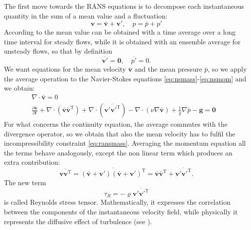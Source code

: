 The first move towards the RANS equations is to decompose each instantaneous 
quantity in the sum of a mean value and a fluctuation: 
\begin{equation} \label{eq:decomp}
\mathbf{v} = \bar{\mathbf{v}} + \mathbf{v}', \quad p = \bar{p} + p'
\end{equation}
According to \cite{main:vermal} the mean value can be obtained with a time 
average over a long time interval 
for steady flows, while it is obtained with an ensemble average for unsteady 
flows, so that by definition
\begin{equation}
	\overline{\mathbf{v}'} = \mathbf{0}, \quad \overline{p'}=0.
\end{equation}
We want equations for the mean 
velocity $\bar{\mathbf{v}}$ and the mean pressure $\bar{p}$, so we apply the 
average operation to the Navier-Stokes equations 
\eqref{eq:nsmass}-\eqref{eq:nsmom} and we obtain:
\begin{align}
\label{eq:ransmass} \nabla \cdot \bar{\mathbf{v}} = 0&\\
\label{eq:ransmom} \frac{\partial \bar{\mathbf{v}}}{\partial t} + \nabla \cdot 
( 
\bar{\mathbf{v}} \bar{\mathbf{v}}^\mathrm{T}) + \nabla \cdot 
(\overline{\mathbf{v}' {\mathbf{v}'}^\mathrm{T}})- \nabla \cdot (\nu \nabla 
\bar{\mathbf{v}}) +\frac{1}{\varrho} \nabla \bar{p} - \mathbf{g} = \mathbf{0}&
\end{align}
For what concerns the continuity equation, the average commutes with the 
divergence operator, so we obtain that also the mean velocity has to fulfil the 
incompressibility constraint \eqref{eq:ransmass}. Averaging the momentum 
equation all the terms behave analogously, except the non linear term which 
produces an extra contribution:
\begin{equation}
	\overline{\mathbf{v} \mathbf{v}^\mathrm{T}} = \overline{(\bar{\mathbf{v}} + 
	\mathbf{v}') (\bar{\mathbf{v}} + \mathbf{v}')^\mathrm{T}} = 
	\bar{\mathbf{v}} \bar{\mathbf{v}}^\mathrm{T} + \overline{\mathbf{v}' 
	{\mathbf{v}'}^\mathrm{T}}.
\end{equation}
The new term
\begin{equation}
\tau_R = -\varrho \overline{\mathbf{v}' {\mathbf{v}'}^\mathrm{T}}
\end{equation}
is called Reynolds stress tensor. Mathematically, it expresses the correlation 
between the components of the instantaneous velocity field, while physically it 
represents the diffusive effect of turbulence (see \cite{main:vermal}).
%
